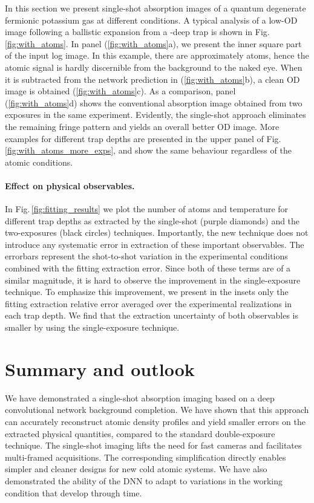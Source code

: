 \documentclass[twocolumn,groupedaddress,longbibliography]{revtex4-1}
\begin{document}
In this section we present single-shot absorption images of a quantum degenerate fermionic potassium gas at different conditions. 
A typical analysis of a low-OD image following a ballistic expansion from a -deep trap is shown in Fig.\,\ref{fig:with_atoms}. In panel (\ref{fig:with_atoms}a), we present the inner square part of the input log image. In this example, there are approximately  atoms, hence the atomic signal is hardly discernible from the background to the naked eye. When it is subtracted from the network prediction in (\ref{fig:with_atoms}b), a clean OD image is obtained (\ref{fig:with_atoms}c). As a comparison, panel (\ref{fig:with_atoms}d) shows the conventional absorption image obtained from two exposures in the same experiment. Evidently, the single-shot approach eliminates the remaining fringe pattern and yields an overall better OD image. More examples for different trap depths are presented in the upper panel of Fig.\,\ref{fig:with_atoms_more_exps}, and show the same behaviour regardless of the atomic conditions.

\paragraph*{Effect on physical observables.}

In Fig.\,\ref{fig:fitting_results} we plot the number of atoms and temperature for different trap depths as extracted by the single-shot (purple diamonds) and the two-exposures (black circles) techniques. Importantly, the new technique does not introduce any systematic error in extraction of these important observables. The errorbars represent the  shot-to-shot variation in the experimental conditions combined with the fitting extraction error. Since both of these terms are of a similar magnitude, it is hard to observe the improvement in the single-exposure technique. To emphasize this improvement, we present in the insets only the fitting extraction relative error averaged over the  experimental realizations in each trap depth. We find that the extraction uncertainty of both observables is smaller by  using the single-exposure technique.

\section{Summary and outlook}

We have demonstrated a single-shot absorption imaging based on a deep convolutional network background completion. We have shown that this approach can accurately reconstruct atomic density profiles and yield smaller errors on the extracted physical quantities, compared to the standard double-exposure technique. The single-shot imaging lifts the need for fast cameras and facilitates multi-framed acquisitions. The corresponding simplification directly enables simpler and cleaner designs for new cold atomic systems. We have also demonstrated the ability of the DNN to adapt to variations in the working condition that develop through time.
\end{document}
